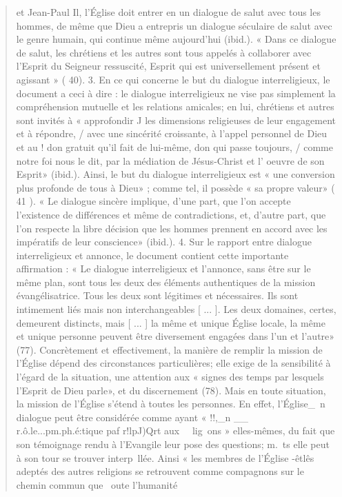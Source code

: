\begin{quote}
et Jean-Paul Il, l'Église doit entrer en un dialogue de salut
avec tous les hommes, de même que Dieu a entrepris un dialogue
séculaire de salut avec le genre humain, qui continue
même aujourd'hui (ibid.). « Dans ce dialogue de salut, les chrétiens
et les autres sont tous appelés à collaborer avec l'Esprit
du Seigneur ressuscité, Esprit qui est universellement présent
et agissant » ( 40).
3. En ce qui concerne le but du dialogue interreligieux, le
document a ceci à dire : le dialogue interreligieux ne vise pas
simplement la compréhension mutuelle et les relations amicales; en lui, chrétiens et autres sont invités à « approfondir J
les dimensions religieuses de leur engagement et à répondre, /
avec une sincérité croissante, à l'appel personnel de Dieu et au !
don gratuit qu'il fait de lui-même, don qui passe toujours, /
comme notre foi nous le dit, par la médiation de Jésus-Christ
et l' oeuvre de son Esprit» (ibid.). Ainsi, le but du dialogue
interreligieux est « une conversion plus profonde de tous à
Dieu» ; comme tel, il possède « sa propre valeur» ( 41 ). « Le
dialogue sincère implique, d'une part, que l'on accepte l'existence
de différences et même de contradictions, et, d'autre
part, que l'on respecte la libre décision que les hommes prennent
en accord avec les impératifs de leur conscience» (ibid.).
4. Sur le rapport entre dialogue interreligieux et annonce, le
document contient cette importante affirmation : « Le dialogue
interreligieux et l'annonce, sans être sur le même plan, sont
tous les deux des éléments authentiques de la mission évangélisatrice.
Tous les deux sont légitimes et nécessaires. Ils sont
intimement liés mais non interchangeables [ ... ]. Les deux
domaines, certes, demeurent distincts, mais [ ... ] la même et
unique Église locale, la même et unique personne peuvent être
diversement engagées dans l'un et l'autre» (77).
Concrètement et effectivement, la manière de remplir la
mission de l'Église dépend des circonstances particulières;
elle exige de la sensibilité à l'égard de la situation, une attention
aux « signes des temps par lesquels l'Esprit de Dieu parle»,
et du discernement (78). Mais en toute situation, la mission de
l'Église s'étend à toutes les personnes. En effet, l'Église_~n
dialogue peut être considérée comme ayant « !!,_n __ r.ô.le...pm.ph.é:tique
paf r!lpJ)Qrt aux ~~lig~ons » elles-mêmes, du fait que son
témoignage rendu à l'Evangile leur pose des questions; m.~ts
elle peut à son tour se trouver interp~llée. Ainsi « les membres
de l'Église -êtlês adeptés des autres religions se retrouvent
comme compagnons sur le chemin commun que ~oute l'humanité

\end{quote}
